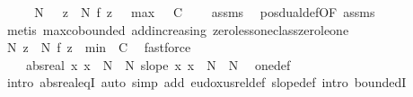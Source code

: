 \begin{isabellebody}
%
\isadelimproof
%
\endisadelimproof
%
\isatagproof
{}\isamarkupfalse%
\ {\isacharminus}{\kern0pt}\isanewline
\ \ \isamarkupfalse%
\ N{\isacharprime}{\kern0pt}\ \ \ {\isachardoublequoteopen}{\isasymforall}z\ {\isasymle}\ N{\isacharprime}{\kern0pt}{\isachardot}{\kern0pt}\ f\ z\ {\isasymle}\ {\isacharminus}{\kern0pt}\ {\isacharparenleft}{\kern0pt}max\ {}\ {\isacharparenleft}{\kern0pt}{\isacharminus}{\kern0pt}\ C{\isacharparenright}{\kern0pt}\ {\isacharplus}{\kern0pt}\ {}{\isacharparenright}{\kern0pt}{\isachardoublequoteclose}\ \isamarkupfalse%
\ assms\ \isamarkupfalse%
\ pos{\isacharunderscore}{\kern0pt}dual{\isacharunderscore}{\kern0pt}def{\isacharbrackleft}{\kern0pt}OF\ assms{\isacharparenleft}{\kern0pt}{}{\isacharparenright}{\kern0pt}{\isacharbrackright}{\kern0pt}\ \isamarkupfalse%
\ {\isacharparenleft}{\kern0pt}metis\ max{\isachardot}{\kern0pt}cobounded{}\ add{\isacharunderscore}{\kern0pt}increasing{}\ zero{\isacharunderscore}{\kern0pt}less{\isacharunderscore}{\kern0pt}one{\isacharunderscore}{\kern0pt}class{\isachardot}{\kern0pt}zero{\isacharunderscore}{\kern0pt}le{\isacharunderscore}{\kern0pt}one{\isacharparenright}{\kern0pt}\isanewline
\ \ \isamarkupfalse%
\ N{\isacharprime}{\kern0pt}{\isacharcolon}{\kern0pt}\ {\isachardoublequoteopen}{\isasymforall}z\ {\isasymle}\ N{\isacharprime}{\kern0pt}{\isachardot}{\kern0pt}\ f\ z\ {\isacharless}{\kern0pt}\ min\ {}\ C{\isachardoublequoteclose}\ \isamarkupfalse%
\ fastforce\isanewline
\ \ \isamarkupfalse%
\ {\isacharasterisk}{\kern0pt}{\isacharcolon}{\kern0pt}\ {\isachardoublequoteopen}{}\ {\isacharequal}{\kern0pt}\ abs{\isacharunderscore}{\kern0pt}real\ {\isacharparenleft}{\kern0pt}{\isasymlambda}x{\isachardot}{\kern0pt}\ x\ {\isacharplus}{\kern0pt}\ N{\isacharprime}{\kern0pt}\ {\isacharminus}{\kern0pt}\ N{\isacharparenright}{\kern0pt}{\isachardoublequoteclose}\ {\isachardoublequoteopen}slope\ {\isacharparenleft}{\kern0pt}{\isasymlambda}x{\isachardot}{\kern0pt}\ x\ {\isacharplus}{\kern0pt}\ N{\isacharprime}{\kern0pt}\ {\isacharminus}{\kern0pt}\ N{\isacharparenright}{\kern0pt}{\isachardoublequoteclose}\ \isamarkupfalse%
\ one{\isacharunderscore}{\kern0pt}def\ \isamarkupfalse%
\ {\isacharparenleft}{\kern0pt}intro\ abs{\isacharunderscore}{\kern0pt}real{\isacharunderscore}{\kern0pt}eqI{\isacharparenright}{\kern0pt}\ {\isacharparenleft}{\kern0pt}auto\ simp\ add{\isacharcolon}{\kern0pt}\ eudoxus{\isacharunderscore}{\kern0pt}rel{\isacharunderscore}{\kern0pt}def\ slope{\isacharunderscore}{\kern0pt}def\ intro{\isacharbang}{\kern0pt}{\isacharcolon}{\kern0pt}\ boundedI{\isacharparenright}{\kern0pt}\isanewline

\end{isabellebody}
